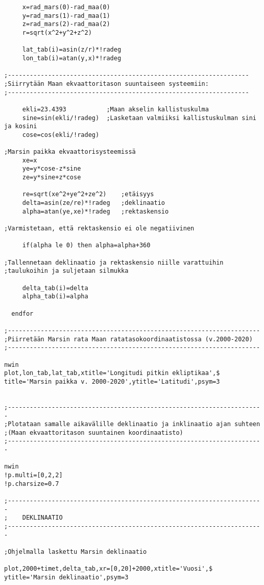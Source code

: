 \documentclass[12pt, a4paper]{article}
\begin{document}
\begin{small}
\begin{verbatim}
     x=rad_mars(0)-rad_maa(0)
     y=rad_mars(1)-rad_maa(1)
     z=rad_mars(2)-rad_maa(2)
     r=sqrt(x^2+y^2+z^2)

     lat_tab(i)=asin(z/r)*!radeg
     lon_tab(i)=atan(y,x)*!radeg

;------------------------------------------------------------------
;Siirrytään Maan ekvaattoritason suuntaiseen systeemiin:
;------------------------------------------------------------------

     ekli=23.4393           ;Maan akselin kallistuskulma
     sine=sin(ekli/!radeg)  ;Lasketaan valmiiksi kallistuskulman sini ja kosini
     cose=cos(ekli/!radeg)

;Marsin paikka ekvaattorisysteemissä
     xe=x
     ye=y*cose-z*sine
     ze=y*sine+z*cose

     re=sqrt(xe^2+ye^2+ze^2)    ;etäisyys
     delta=asin(ze/re)*!radeg   ;deklinaatio
     alpha=atan(ye,xe)*!radeg   ;rektaskensio

;Varmistetaan, että rektaskensio ei ole negatiivinen

     if(alpha le 0) then alpha=alpha+360

;Tallennetaan deklinaatio ja rektaskensio niille varattuihin
;taulukoihin ja suljetaan silmukka

     delta_tab(i)=delta
     alpha_tab(i)=alpha

  endfor

;---------------------------------------------------------------------
;Piirretään Marsin rata Maan ratatasokoordinaatistossa (v.2000-2020)
;---------------------------------------------------------------------

nwin
plot,lon_tab,lat_tab,xtitle='Longitudi pitkin ekliptikaa',$
title='Marsin paikka v. 2000-2020',ytitle='Latitudi',psym=3


;----------------------------------------------------------------------
;Plotataan samalle aikavälille deklinaatio ja inklinaatio ajan suhteen
;(Maan ekvaattoritason suuntainen koordinaatisto)
;----------------------------------------------------------------------

nwin
!p.multi=[0,2,2]
!p.charsize=0.7

;----------------------------------------------------------------------
;    DEKLINAATIO
;----------------------------------------------------------------------

;Ohjelmalla laskettu Marsin deklinaatio

plot,2000+timet,delta_tab,xr=[0,20]+2000,xtitle='Vuosi',$
ytitle='Marsin deklinaatio',psym=3



\end{verbatim}
\end{small}
\end{document}
